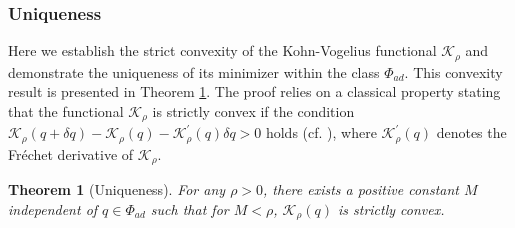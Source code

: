 \documentclass[a4paper,12pt,reqno,natbib]{amsart}
\newtheorem{theorem}{Theorem}
\def\K{\mathcal K}
\begin{document}
\subsubsection{\bf Uniqueness} 
Here we establish the strict convexity of the Kohn-Vogelius functional $\K_\rho$ and demonstrate the uniqueness of its minimizer within the class $\Phi_{ad}$. This convexity result is presented in Theorem \ref{new-uniqueness-condition}. The proof relies on a classical property stating that the functional $\K_\rho$ is strictly convex if the condition $\mathcal{K}_\rho(q+\delta q)-\mathcal{K}_\rho(q) -\mathcal{K}^\prime_\rho(q)\delta q>0$ holds (cf. \cite[Lemma 15.4]{IntroductionKO}), where $\mathcal{K}^\prime_\rho(q)$ denotes the Fr\'echet derivative of $\K_\rho$.


\begin{theorem}[Uniqueness]\label{new-uniqueness-condition}
    For any $\rho>0$, there exists a positive constant $M$ independent of $q\in\Phi_{ad}$ such that for $M<\rho$, $\mathcal{K}_\rho(q)$ is strictly convex.
\end{theorem}
\end{document}
